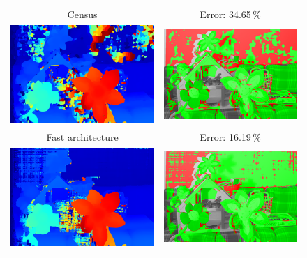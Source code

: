 \documentclass[twoside,11pt]{article}
\begin{document}
\begin{figure}[p]
\begin{center}
\begin{tabular}{cc}
Census &
Error: 34.65\,\% \\
\includegraphics[scale=0.5]{img/mb_census_7_2_pred_.png} &
\includegraphics[scale=0.5]{img/mb_census_7_2_err_.png}\\

Fast architecture &
Error: 16.19\,\% \\
\includegraphics[scale=0.5]{img/mb_fast_7_2_pred_.png} &
\includegraphics[scale=0.5]{img/mb_fast_7_2_err_.png} \\


\end{tabular}
\end{center}
\end{figure}
\end{document}
